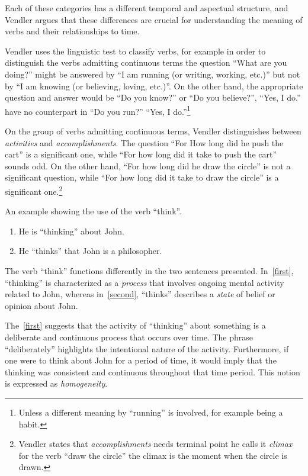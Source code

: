Each of these categories has a different temporal and aspectual structure, and Vendler argues that these differences are crucial for understanding the meaning of verbs and their relationships to time.



Vendler uses the linguistic test to classify verbs, for example in order to distinguish the verbs admitting continuous terms the question ``What are you doing?'' might be answered by
``I am running (or writing, working, etc.)''
but not by ``I am knowing (or believing, loving, etc.)''.
On the other hand, the appropriate question and answer would be ``Do you know?'' or ``Do you believe?'',
``Yes, I do.'' have no counterpart in ``Do you run?'' ``Yes, I do.''\footnote{Unless a different meaning by ``running'' is involved, for example being a habit.}

On the group of verbs admitting continuous terms, Vendler distinguishes between \textit{activities} and \textit{accomplishments}. The question
``For How long did he push the cart'' is a significant one, while ``For how long did it take to push the cart'' sounds odd. On the other hand,
``For how long did he draw the circle'' is not a significant question, while ``For how long did it take to draw the circle'' is a significant one.\footnote{Vendler states that \textit{accomplishments} needs terminal point he calls it \textit{climax} for the verb ``draw the circle'' the climax is the moment when the circle is drawn.}


\begin{exmp} An example showing the use of the verb ``think''.
	\begin{enumerate}[label=(\arabic*)]
		\item He is ``thinking'' about John. \label{first}
		\item He ``thinks'' that John is a philosopher. \label{second}
	\end{enumerate}

	The verb ``think'' functions differently in the two sentences presented. In~\ref{first}, ``thinking'' is characterized as a \textit{process} that involves ongoing mental activity related to John, whereas in~\ref{second}, ``thinks'' describes a \textit{state} of belief or opinion about John.

	The~\ref{first} suggests that the activity of ``thinking'' about something is a deliberate and continuous process that occurs over time. The phrase ``deliberately'' highlights the intentional nature of the activity. Furthermore, if one were to think about John for a period of time, it would imply that the thinking was consistent and continuous throughout that time period. This notion is expressed as \textit{homogeneity}.
\end{exmp}



